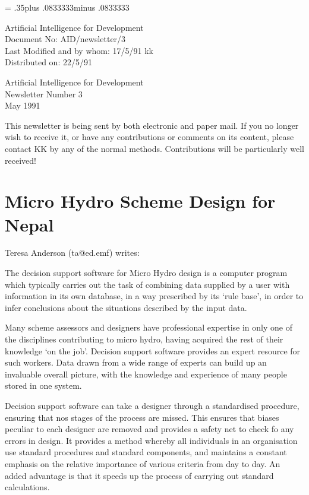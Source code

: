 \pagestyle{myheadings}
\setlength{\textheight}{9in}
\setlength{\topmargin}{0in}
\setlength{\headheight}{.3in}
\setlength{\headsep}{.5in}
\parindent=0pt
\parskip= .35\baselineskip plus .0833333\baselineskip minus .0833333\baselineskip

Artificial Intelligence for Development\\
Document No: AID/newsletter/3\\
Last Modified and by whom: 17/5/91 kk \\
Distributed on: 22/5/91\\
\LARGE
\begin{center} Artificial Intelligence for Development\\
Newsletter Number 3\\May 1991\\
\end{center}
\normalsize

This newsletter is being sent by both electronic and paper mail. If
you no longer wish to receive it, or have any contributions or
comments on its content, please contact KK by any of the normal
methods. Contributions will be particularly well received!

\section{Micro Hydro Scheme Design for Nepal}
Teresa Anderson (ta@ed.emf) writes:

The decision support software for Micro Hydro design is a computer
program which typically carries out the task of combining data
supplied by a user with information in its own database, in a way
prescribed by its `rule base', in order to infer conclusions about the
situations described by the input data.

Many scheme assessors and designers have professional expertise in only
one of the disciplines contributing to micro hydro, having acquired
the rest of their knowledge `on the job'. Decision support software
provides an expert resource for such workers. Data drawn from a wide
range of experts can build up an invaluable overall picture, with the
knowledge and experience of many people stored in one system.

Decision support software can take a designer through a standardised
procedure, ensuring that nos stages of the process are missed. This
ensures that biases peculiar to each designer are removed and provides
a safety net to check fo any errors in design. It provides a method
whereby all individuals in an organisation use standard procedures and
standard components, and maintains a constant emphasis on the relative
importance of various criteria from day to day. An added advantage is
that it speeds up the process of carrying out standard calculations.

